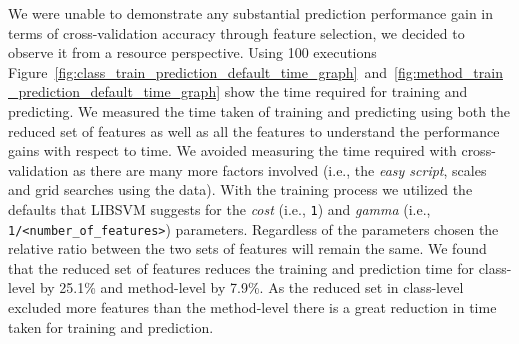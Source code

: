 We were unable to demonstrate any substantial prediction performance gain in terms of cross-validation accuracy through feature selection, we decided to observe it from a resource perspective. Using 100 executions Figure~\ref{fig:class_train_prediction_default_time_graph}~and~\ref{fig:method_train_prediction_default_time_graph} show the time required for training and predicting. We measured the time taken of training and predicting using both the reduced set of features as well as all the features to understand the performance gains with respect to time. We avoided measuring the time required with cross-validation as there are many more factors involved (i.e., the \emph{easy script}, scales and grid searches using the data). With the training process we utilized the defaults that LIBSVM suggests for the \emph{cost} (i.e., \texttt{1}) and \emph{gamma} (i.e., \texttt{1/<number\_of\_features>}) parameters. Regardless of the parameters chosen the relative ratio between the two sets of features will remain the same. We found that the reduced set of features reduces the training and prediction time for class-level by 25.1\% and method-level by 7.9\%. As the reduced set in class-level excluded more features than the method-level there is a great reduction in time taken for training and prediction.
